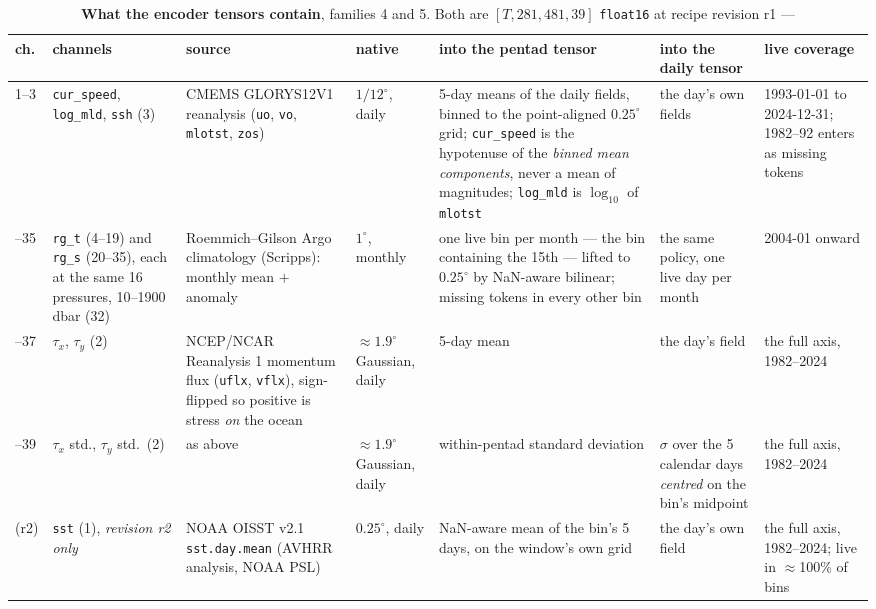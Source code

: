 \documentclass[10pt]{article}
\begin{document}
\begin{table}[p]
\centering\small
\setlength{\tabcolsep}{4pt}
\begin{tabular}{R{1.15cm}R{2.2cm}R{2.5cm}R{1.4cm}R{2.7cm}R{1.9cm}R{1.8cm}}
\toprule
ch. & channels & source & native & into the pentad tensor & into the
daily tensor & live coverage \\
--3 &
\texttt{cur\_speed}, \texttt{log\_mld}, \texttt{ssh} (3) &
CMEMS \mbox{GLORYS12V1} reanalysis (\texttt{uo}, \texttt{vo},
\texttt{mlotst}, \texttt{zos}) &
$1/12^\circ$, daily &
5-day means of the daily fields, binned to the point-aligned
$0.25^\circ$ grid; \texttt{cur\_speed} is the hypotenuse of the
\emph{binned mean components}, never a mean of magnitudes;
\texttt{log\_mld} is $\log_{10}$ of \texttt{mlotst} &
the day's own fields &
1993-01-01 to 2024-12-31; 1982--92 enters as missing tokens \\
--35 &
\texttt{rg\_t} (4--19) and \texttt{rg\_s} (20--35), each at the same 16
pressures, 10--1900\,dbar (32) &
Roemmich--Gilson Argo climatology (Scripps): monthly mean $+$ anomaly &
$1^\circ$, monthly &
one live bin per month --- the bin containing the 15th --- lifted to
$0.25^\circ$ by NaN-aware bilinear; missing tokens in every other bin &
the same policy, one live day per month &
2004-01 onward \\
--37 &
$\tau_x$, $\tau_y$ (2) &
NCEP/NCAR Reanalysis 1 momentum flux (\texttt{uflx}, \texttt{vflx}),
sign-flipped so positive is stress \emph{on} the ocean &
$\approx1.9^\circ$ Gaussian, daily &
5-day mean &
the day's field &
the full axis, 1982--2024 \\
--39 &
$\tau_x$ std., $\tau_y$ std.\ (2) &
as above &
$\approx1.9^\circ$ Gaussian, daily &
within-pentad standard deviation &
$\sigma$ over the 5 calendar days \emph{centred} on the bin's midpoint
&
the full axis, 1982--2024 \\
 (r2) &
\texttt{sst} (1), \emph{revision r2 only} &
NOAA OISST v2.1 \texttt{sst.day.mean} (AVHRR analysis, NOAA PSL) &
$0.25^\circ$, daily &
NaN-aware mean of the bin's 5 days, on the window's own grid &
the day's own field &
the full axis, 1982--2024; live in $\approx$100\% of bins \\
\bottomrule
\end{tabular}
\caption{\textbf{What the encoder tensors contain}, families 4 and 5.
Both are $[T,281,481,39]$ \texttt{float16} at recipe revision r1 ---
}
\end{table}
\end{document}
